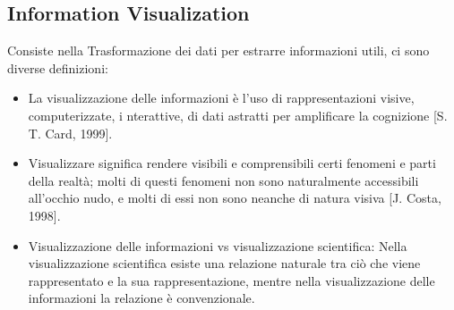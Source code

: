 \subsection{Information Visualization}
Consiste nella Trasformazione dei dati per estrarre informazioni utili, ci sono diverse definizioni:
\begin{itemize}
    
    
    \item{La visualizzazione delle informazioni è l'uso di rappresentazioni visive, computerizzate, i
    nterattive, di dati astratti per amplificare la cognizione [S. T. Card, 1999].}

    \item{Visualizzare significa rendere visibili e comprensibili certi fenomeni e 
        parti della realtà; molti di questi fenomeni non sono naturalmente accessibili all'occhio nudo, 
        e molti di essi non sono neanche di natura visiva [J. Costa, 1998].}

    \item {Visualizzazione delle informazioni vs visualizzazione scientifica:
     Nella visualizzazione scientifica esiste una relazione naturale tra ciò che viene rappresentato e la sua rappresentazione,
      mentre nella visualizzazione delle informazioni la relazione è convenzionale.}

\end{itemize}
